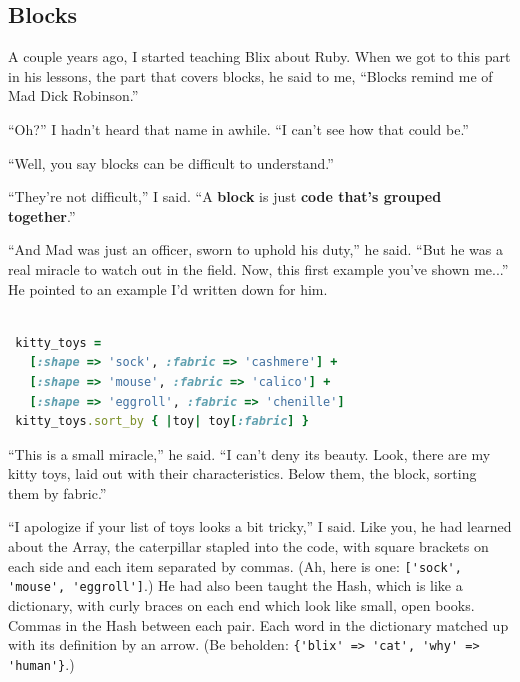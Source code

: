 \documentclass[10pt,twoside]{report}
\begin{document}
\subsection{Blocks}



A couple years ago, I started teaching Blix about Ruby.  When we got
to this part in his lessons, the part that covers blocks, he said to
me, ``Blocks remind me of Mad Dick Robinson.''

``Oh?''  I hadn't heard that name in awhile.  ``I can't see how that
could be.''

``Well, you say blocks can be difficult to understand.''

``They're not difficult,'' I said.  ``A {\bf block} is just {\bf code
  that's grouped together}.''

``And Mad was just an officer, sworn to uphold his duty,'' he said.
``But he was a real miracle to watch out in the field.  Now, this
first example you've shown me...''  He pointed to an example I'd
written down for him.


\begin{lstlisting}[basicstyle=\ttfamily\color{basiccolor},
    commentstyle = \ttfamily\color{commentcolor},
    keywordstyle=\ttfamily\color{keywordscolor},
    stringstyle=\color{stringcolor},
    language=Ruby,
    basicstyle=\small\ttfamily,
    showstringspaces=false,
  ]

 kitty_toys = 
   [:shape => 'sock', :fabric => 'cashmere'] +
   [:shape => 'mouse', :fabric => 'calico'] +
   [:shape => 'eggroll', :fabric => 'chenille'] 
 kitty_toys.sort_by { |toy| toy[:fabric] }

\end{lstlisting}


``This is a small miracle,'' he said. ``I can't deny its beauty.
Look, there are my kitty toys, laid out with their characteristics.
Below them, the block, sorting them by fabric.''

``I apologize if your list of toys looks a bit tricky,'' I said.  Like
you, he had learned about the Array, the caterpillar stapled into the
code, with square brackets on each side and each item separated by
commas.  (Ah, here is one: 
\lstinline[breaklines=true]|['sock', 'mouse', 'eggroll']|.) 
He had also been taught the Hash, which is like a dictionary, with
curly braces on each end which look like small, open books.  Commas in
the Hash between each pair.  Each word in the dictionary matched up
with its definition by an arrow.  (Be beholden:
\lstinline[breaklines=true]|{'blix' => 'cat', 'why' => 'human'}|.)
\end{document}
